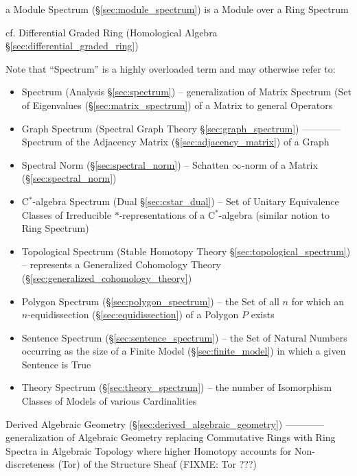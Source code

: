 a Module Spectrum (\S\ref{sec:module_spectrum}) is a Module over a Ring Spectrum

cf. Differential Graded Ring (Homological Algebra
\S\ref{sec:differential_graded_ring})

\fist Note that ``Spectrum'' is a highly overloaded term and may otherwise
refer to:
\begin{itemize}
  \item Spectrum (Analysis \S\ref{sec:spectrum}) -- generalization of Matrix
    Spectrum (Set of Eigenvalues (\S\ref{sec:matrix_spectrum}) of a Matrix to
    general Operators

  \item Graph Spectrum (Spectral Graph Theory \S\ref{sec:graph_spectrum}) ------------
    Spectrum of the Adjacency Matrix (\S\ref{sec:adjacency_matrix}) of a Graph

  \item Spectral Norm (\S\ref{sec:spectral_norm}) -- Schatten $\infty$-norm of
    a Matrix (\S\ref{sec:spectral_norm})

  \item C$^*$-algebra Spectrum (Dual \S\ref{sec:cstar_dual}) -- Set of Unitary
    Equivalence Classes of Irreducible $*$-representations of a C$^*$-algebra
    (similar notion to Ring Spectrum)

  \item Topological Spectrum (Stable Homotopy Theory
    \S\ref{sec:topological_spectrum}) -- represents a Generalized Cohomology
    Theory (\S\ref{sec:generalized_cohomology_theory})

  \item Polygon Spectrum (\S\ref{sec:polygon_spectrum}) -- the Set of all $n$
    for which an $n$-equidissection (\S\ref{sec:equidissection}) of a Polygon
    $P$ exists

  \item Sentence Spectrum (\S\ref{sec:sentence_spectrum}) -- the Set of Natural
    Numbers occurring as the size of a Finite Model (\S\ref{sec:finite_model})
    in which a given Sentence is True
  \item Theory Spectrum (\S\ref{sec:theory_spectrum}) -- the number of
    Isomorphism Classes of Models of various Cardinalities
\end{itemize}

\fist Derived Algebraic Geometry (\S\ref{sec:derived_algebraic_geometry}) ------------
generalization of Algebraic Geometry replacing Commutative Rings with Ring
Spectra in Algebraic Topology where higher Homotopy accounts for
Non-discreteness (Tor) of the Structure Sheaf (FIXME: Tor ???)


